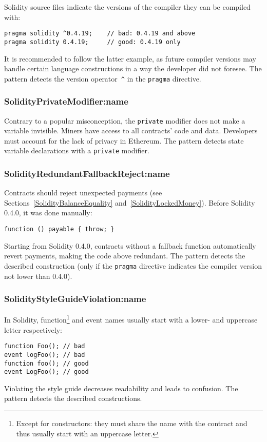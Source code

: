 Solidity source files indicate the versions of the compiler they can be compiled with:
\begin{lstlisting}[language=Solidity]
pragma solidity ^0.4.19;	// bad: 0.4.19 and above
pragma solidity 0.4.19;		// good: 0.4.19 only
\end{lstlisting}
It is recommended to follow the latter example, as future compiler versions may handle certain language constructions in a way the developer did not foresee.
The pattern detects the version operator~\texttt{\^{}} in the \texttt{pragma} directive.

\subsubsection{\usevalue SolidityPrivateModifier:name } \label{SolidityPrivateModifier}

Contrary to a popular misconception, the \texttt{private} modifier does not make a variable invisible.
Miners have access to all contracts' code and data.
Developers must account for the lack of privacy in Ethereum.
The pattern detects state variable declarations with a \texttt{private} modifier.

\subsubsection{\usevalue SolidityRedundantFallbackReject:name } \label{SolidityRedundantFallbackReject}

Contracts should reject unexpected payments (see Sections~\ref{SolidityBalanceEquality} and~\ref{SolidityLockedMoney}).
Before Solidity 0.4.0, it was done manually:
\begin{lstlisting}[language=Solidity]
function () payable { throw; }
\end{lstlisting}
Starting from Solidity 0.4.0, contracts without a fallback function automatically revert payments, making the code above redundant.
The pattern detects the described construction (only if the \texttt{pragma} directive indicates the compiler version not lower than 0.4.0).


\subsubsection{\usevalue SolidityStyleGuideViolation:name } \label{SolidityStyleGuideViolation}

In Solidity, function\footnote{Except for constructors: they must share the name with the contract and thus usually start with an uppercase letter.} and event names usually start with a lower- and uppercase letter respectively:
\begin{lstlisting}[language=Solidity]
function Foo(); // bad
event logFoo(); // bad
function foo(); // good
event LogFoo(); // good
\end{lstlisting}
Violating the style guide decreases readability and leads to confusion.
The pattern detects the described constructions.

